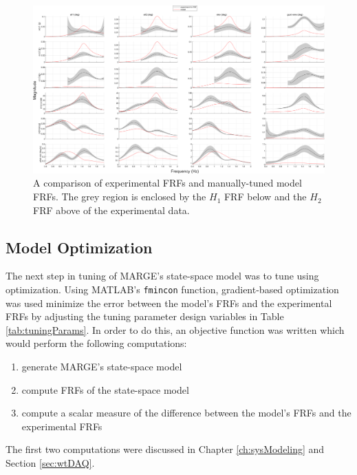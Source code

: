 \begin{landscape}

\begin{figure}[H]
	\centering
	\label{fig:manualTunedFRF}
	\includegraphics[width=9in]{figs/FRFcompare_manualTune_q207.png}
	\caption{A comparison of experimental FRFs and manually-tuned model FRFs. The grey region is enclosed by the $H_1$ FRF below and the $H_2$ FRF above of the experimental data.}
\end{figure}

\end{landscape}

\subsection{Model Optimization} %

The next step in tuning of MARGE's state-space model was to tune using optimization. Using MATLAB's \verb|fmincon| function, gradient-based optimization was used minimize the error between the model's FRFs and the experimental FRFs by adjusting the tuning parameter design variables in Table \ref{tab:tuningParams}. In order to do this, an objective function was written which would perform the following computations:
\begin{enumerate}
	\item generate MARGE's state-space model
	\item compute FRFs of the state-space model
	\item compute a scalar measure of the difference between the model's FRFs and the experimental FRFs
\end{enumerate}
The first two computations were discussed in Chapter \ref{ch:sysModeling} and Section \ref{sec:wtDAQ}.

